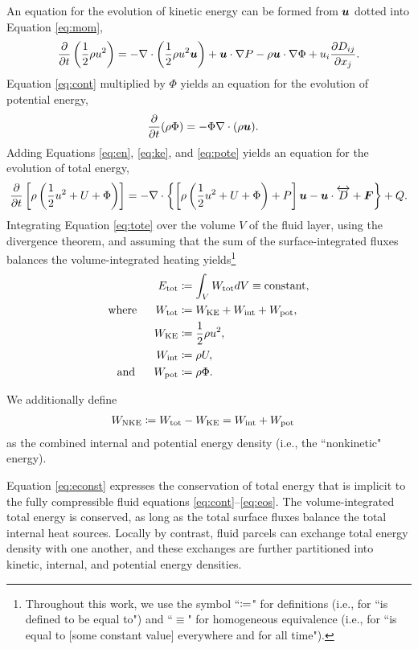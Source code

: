 \documentclass[12pt]{article}
\newcommand{\vecf}{\bm{F}}
\newcommand{\etot}{E_{\rm tot}}
\newcommand{\wtot}{W_{\rm tot}}
\newcommand{\wke}{W_{\rm KE}}
\newcommand{\wnke}{W_{\rm NKE}}
\newcommand{\wint}{W_{\rm int}}
\newcommand{\wpot}{W_{\rm pot}}
\begin{document}
	An equation for the evolution of kinetic energy can be formed from $\bm{u}$ dotted into Equation \eqref{eq:mom},
	\begin{align}\label{eq:ke}
		\frac{\partial}{\partial t}\left(\frac{1}{2}\rho u^2\right) = - \nabla\cdot\left(\frac{1}{2}\rho u^2\bm{u} \right) + \bm{u}\cdot\nabla P - \rho\bm{u}\cdot\nabla\Phi+ u_i\frac{\partial D_{ij}}{\partial x_j}.
	\end{align}
	Equation \eqref{eq:cont} multiplied by $\Phi$ yields an equation for the evolution of potential energy,
	\begin{align}\label{eq:pote}
		\frac{\partial}{\partial t}(\rho\Phi) &= - \Phi \nabla\cdot(\rho\bm{u}).
	\end{align}
	Adding Equations \eqref{eq:en}, \eqref{eq:ke}, and \eqref{eq:pote} yields an equation for the evolution of total energy,
	\begin{align}\label{eq:tote}
		\pderiv{}{t}\left[\rho\left(\frac{1}{2} u^2 + U + \Phi\right)\right] = -\Div\left\{\left[\rho\left(\frac{1}{2} u^2 + U + \Phi\right) + P\right]\vecu- \vecu\cdot\overleftrightarrow{D} + \vecf\right\} + Q.
	\end{align}
	Integrating Equation \eqref{eq:tote} over the volume $V$ of the fluid layer, using the divergence theorem, and assuming that the sum of the surface-integrated fluxes balances the volume-integrated heating yields\footnote{Throughout this work, we use the symbol ``$\coloneqq$" for definitions (i.e., for ``is defined to be equal to") and ``$\equiv$" for homogeneous equivalence (i.e., for ``is equal to [some constant value] everywhere and for all time").}
	\begin{subequations}\label{eq:econst}
	\begin{align}
		\etot &\define \int_V \wtot dV \equiv \text{constant},\\
		\where \wtot &\define \wke + \wint + \wpot,\\
		\wke &\define \frac{1}{2}\rho u^2,\\
		\wint &\define \rho U,\\
		\andd \wpot &\define \rho \Phi. 
	\end{align}
	\end{subequations}
	
	We additionally define
	\begin{align}\label{eq:wnke}
		\wnke &\define \wtot - \wke = \wint + \wpot 
	\end{align}
	as the combined internal and potential energy density (i.e., the ``nonkinetic" energy). 
	
	Equation \eqref{eq:econst} expresses the conservation of total energy that is implicit to the fully compressible fluid equations \eqref{eq:cont}--\eqref{eq:eos}. The volume-integrated total energy is conserved, as long as the total surface fluxes balance the total internal heat sources. Locally by contrast, fluid parcels can exchange total energy density with one another, and these exchanges are further partitioned into kinetic, internal, and potential energy densities. 
	
\end{document}
